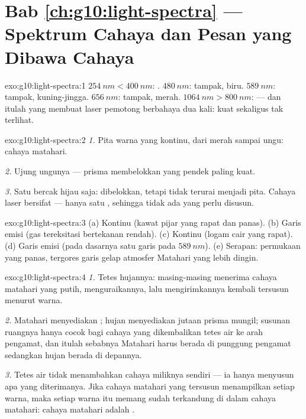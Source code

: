 \section*{Bab \ref{ch:g10:light-spectra} --- Spektrum Cahaya dan Pesan yang Dibawa Cahaya}

\begin{solution}{exo:g10:light-spectra:1}
$\qty{254}{nm} < \qty{400}{nm}$: . $\qty{480}{nm}$: tampak,
biru. $\qty{589}{nm}$: tampak, kuning-jingga. $\qty{656}{nm}$: tampak,
merah. $\qty{1064}{nm} > \qty{800}{nm}$:  --- dan itulah yang
membuat laser pemotong berbahaya dua kali: kuat sekaligus tak terlihat.
\end{solution}

\begin{solution}{exo:g10:light-spectra:2}
\emph{1.} Pita warna yang kontinu, dari merah sampai ungu: 
cahaya matahari.

\emph{2.} Ujung ungunya --- prisma membelokkan  yang
pendek paling kuat.

\emph{3.} Satu bercak hijau saja: dibelokkan, tetapi tidak terurai
menjadi pita. Cahaya laser bersifat  --- hanya satu , sehingga tidak ada yang perlu disusun.
\end{solution}

\begin{solution}{exo:g10:light-spectra:3}
(a) Kontinu (kawat pijar yang rapat dan panas). (b) Garis emisi (gas
tereksitasi bertekanan rendah). (c) Kontinu (logam cair yang rapat).
(d) Garis emisi (pada dasarnya satu garis pada $\qty{589}{nm}$).
(e) Serapan:  permukaan yang panas, tergores garis
gelap atmosfer Matahari yang lebih dingin.
\end{solution}

\begin{solution}{exo:g10:light-spectra:4}
\emph{1.} Tetes hujannya: masing-masing menerima cahaya matahari yang
putih, menguraikannya, lalu mengirimkannya kembali tersusun menurut
warna.

\emph{2.} Matahari menyediakan ; hujan menyediakan
jutaan prisma mungil; susunan ruangnya hanya cocok bagi cahaya yang
dikembalikan tetes air ke arah pengamat, dan itulah sebabnya Matahari
harus berada di punggung pengamat sedangkan hujan berada di depannya.

\emph{3.} Tetes air tidak menambahkan cahaya miliknya sendiri --- ia
hanya menyusun apa yang diterimanya. Jika cahaya matahari yang tersusun
menampilkan setiap warna, maka setiap warna itu memang sudah terkandung
di dalam cahaya matahari: cahaya matahari adalah .
\end{solution}


